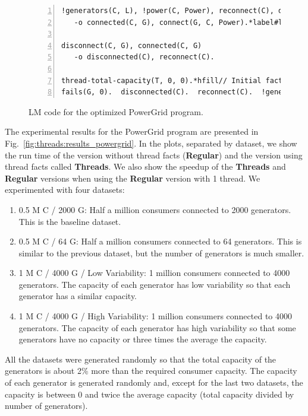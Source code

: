 \begin{figure}[h!]
\begin{Verbatim}[numbers=left,fontsize=\scriptsize,commandchars=*\#\&]
!generators(C, L), !power(C, Power), reconnect(C), disconnected(C), G = nth(L, randint(num-generators))*label#line:threads:pgt_conn1&
   -o connected(C, G), connect(G, C, Power).*label#line:threads:pgt_conn2&

disconnect(C, G), connected(C, G)
   -o disconnected(C), reconnect(C).

thread-total-capacity(T, 0, 0).*hfill// Initial facts
fails(G, 0).  disconnected(C).  reconnect(C).  !generators(C, all-generators).  start(G).
\end{Verbatim}
\caption{LM code for the optimized PowerGrid program.}
\label{code:threads:powergridt}
\end{figure}

The experimental results for the PowerGrid program are presented in
Fig.~\ref{fig:threads:results_powergrid}. In the plots, separated by dataset, we
show the run time of the version without thread facts (\textbf{Regular}) and the
version using thread facts called \textbf{Threads}. We also show the speedup of
the \textbf{Threads} and \textbf{Regular} versions when using the
\textbf{Regular} version with 1 thread.  We experimented with four datasets:

\begin{enumerate}
      \item 0.5 M C / 2000 G: Half a million consumers connected to 2000
         generators. This is the baseline dataset.

      \item 0.5 M C / 64 G: Half a million consumers connected to 64
         generators. This is similar to the previous dataset, but the number of
         generators is much smaller.

      \item 1 M C / 4000 G / Low Variability: 1 million consumers connected to
         4000 generators. The capacity of each generator has low variability so
         that each generator has a similar capacity.

      \item 1 M C / 4000 G / High Variability: 1 million consumers connected to
         4000 generators. The capacity of each generator has high variability so
         that some generators have no capacity or three times the average the
         capacity.

\end{enumerate}

All the datasets were generated randomly so that the total capacity of the
generators is about 2\% more than the required consumer capacity. The capacity
of each generator is generated randomly and, except for the last two datasets,
the capacity is between 0 and twice the average capacity (total capacity divided
by number of generators).

